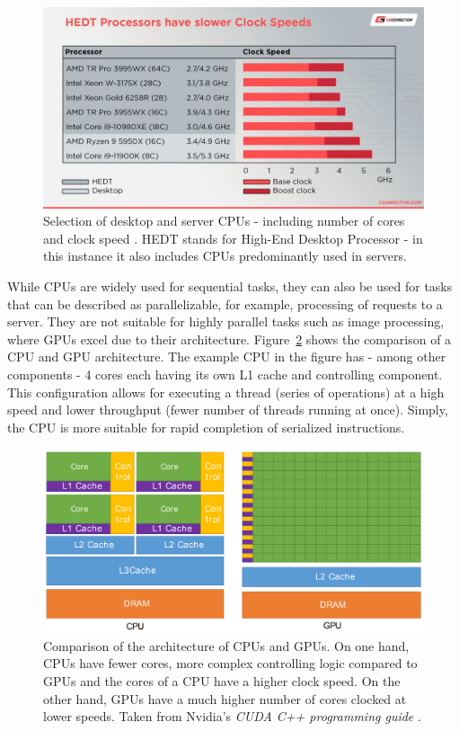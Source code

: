 \begin{figure}[ht!]
	\centering
	\includegraphics[width=14cm, keepaspectratio]{images/ch1/processors_comparison.png}
	\caption{Selection of desktop and server CPUs - including number of cores and clock speed \cite{Glawion7March2022}. HEDT stands for High-End Desktop Processor - in this instance it also includes CPUs predominantly used in servers.}
	\label{Figure:theory-GPUs-GPGPU-processor-comparison}
\end{figure}

While CPUs are widely used for sequential tasks, they can also be used for tasks that can be described as parallelizable, for example, processing of requests to a server. They are not suitable for highly parallel tasks such as image processing, where GPUs excel due to their architecture. Figure~\ref{Figure:theory-GPUs-GPGPU-nvidia-CPU-GPU-architecture-comparison} shows the comparison of a CPU and GPU architecture. The example CPU in the figure has - among other components - 4 cores each having its own L1 cache and controlling component. This configuration allows for executing a thread (series of operations) at a high speed and lower throughput (fewer number of threads running at once). Simply, the CPU is more suitable for rapid completion of serialized instructions.

\begin{figure}[ht!]
	\centering
	\includegraphics[width=14cm, keepaspectratio]{images/ch1/nvidia_CPU_GPU_comparison.png}
	\caption{Comparison of the architecture of CPUs and GPUs. On one hand, CPUs have fewer cores, more complex controlling logic compared to GPUs and the cores of a CPU have a higher clock speed. On the other hand, GPUs have a much higher number of cores clocked at lower speeds. Taken from Nvidia's \emph{CUDA C++ programming guide} \cite{NVIDIAMay2022}.}
	\label{Figure:theory-GPUs-GPGPU-nvidia-CPU-GPU-architecture-comparison}
\end{figure}

